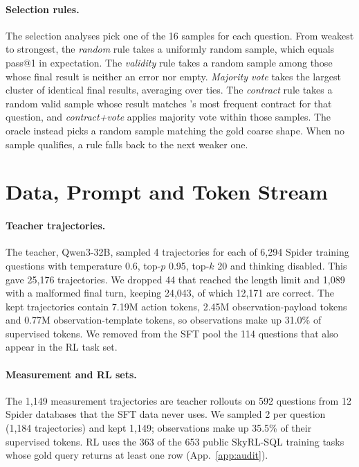 \paragraph{Selection rules.}
The selection analyses pick one of the 16 samples for each question. From weakest to strongest, the \emph{random} rule takes a uniformly random sample, which equals pass@1 in expectation. The \emph{validity} rule takes a random sample among those whose final result is neither an error nor empty. \emph{Majority vote} takes the largest cluster of identical final results, averaging over ties. The \emph{contract} rule takes a random valid sample whose result matches \armG's most frequent contract for that question, and \emph{contract+vote} applies majority vote within those samples. The oracle instead picks a random sample matching the gold coarse shape. When no sample qualifies, a rule falls back to the next weaker one.

\section{Data, Prompt and Token Stream}
\label{app:data}

\paragraph{Teacher trajectories.}
The teacher, Qwen3-32B, sampled 4 trajectories for each of 6,294 Spider training questions with temperature 0.6, top-$p$ 0.95, top-$k$ 20 and thinking disabled. This gave 25,176 trajectories. We dropped 44 that reached the length limit and 1,089 with a malformed final turn, keeping 24,043, of which 12,171 are correct. The kept trajectories contain 7.19M action tokens, 2.45M observation-payload tokens and 0.77M observation-template tokens, so observations make up 31.0\% of supervised tokens. We removed from the SFT pool the 114 questions that also appear in the RL task set.

\paragraph{Measurement and RL sets.}
The 1,149 measurement trajectories are teacher rollouts on 592 questions from 12 Spider databases that the SFT data never uses. We sampled 2 per question (1,184 trajectories) and kept 1,149; observations make up 35.5\% of their supervised tokens. RL uses the 363 of the 653 public SkyRL-SQL training tasks whose gold query returns at least one row (App.~\ref{app:audit}).

